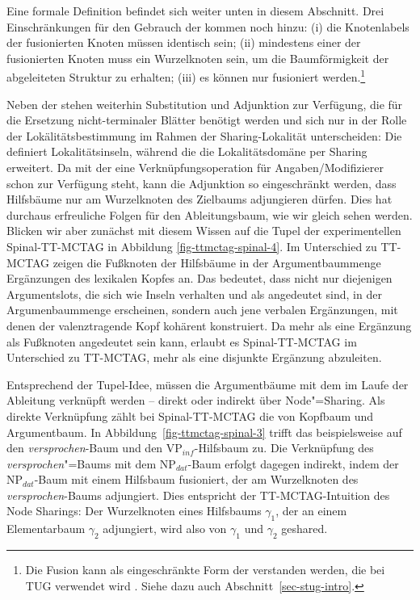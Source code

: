 Eine formale Definition befindet sich weiter unten in diesem Abschnitt. Drei Einschränkungen für den Gebrauch der  kommen noch hinzu: (i) die Knotenlabels der fusionierten Knoten müssen identisch sein; (ii) mindestens einer der fusionierten Knoten muss ein Wurzelknoten sein, um die Baumförmigkeit der abgeleiteten Struktur zu erhalten; (iii) es können nur  fusioniert werden.\footnote{Die Fusion kann als eingeschränkte Form der  verstanden werden, die bei TUG verwendet wird \citep{Popowich:89,Gerdes:04}. Siehe dazu auch Abschnitt~\ref{sec-stug-intro}.} 

Neben der  stehen weiterhin Substitution und Adjunktion zur Verfügung, die für die Ersetzung nicht-terminaler Blätter benötigt werden und sich nur in der Rolle der Lokälitätsbestimmung im Rahmen der Sharing-Lokalität unterscheiden: Die  definiert Lokalitätsinseln, während die  die Lokalitätsdomäne per Sharing erweitert. Da mit der  eine Verknüpfungsoperation für Angaben/Modifizierer schon zur Verfügung steht, kann die Adjunktion so eingeschränkt werden, dass Hilfsbäume nur am Wurzelknoten des Zielbaums adjungieren dürfen. Dies hat durchaus erfreuliche Folgen für den Ableitungsbaum, wie wir gleich sehen werden. Blicken wir aber zunächst mit diesem Wissen auf die Tupel der experimentellen Spinal-TT-MCTAG in Abbildung \ref{fig-ttmctag-spinal-4}. 
Im Unterschied zu TT-MCTAG zeigen die Fu\ss knoten der Hilfsbäume in der Argumentbaummenge Ergänzungen des lexikalen Kopfes an. Das bedeutet, dass nicht nur diejenigen Argumentslots, die sich wie Inseln verhalten und als  angedeutet sind, in der Argumenbaummenge erscheinen,  sondern auch jene verbalen Ergänzungen, mit denen der valenztragende Kopf kohärent konstruiert. Da mehr als eine Ergänzung als Fu\ss knoten angedeutet sein kann, erlaubt es Spinal-TT-MCTAG im Unterschied zu TT-MCTAG, mehr als eine disjunkte Ergänzung abzuleiten.  

Entsprechend der Tupel-Idee, müssen die Argumentbäume mit dem  im Laufe der Ableitung verknüpft werden -- direkt oder indirekt über Node"=Sharing. Als direkte Verknüpfung zählt bei Spinal-TT-MCTAG die  von Kopfbaum und Argumentbaum. In Abbildung~\ref{fig-ttmctag-spinal-3} trifft das beispielsweise auf den {\it versprochen}-Baum und den VP$_{inf}$-Hilfsbaum zu. Die Verknüpfung des {\it versprochen}"=Baums mit dem NP$_{dat}$-Baum erfolgt dagegen indirekt, indem der NP$_{dat}$-Baum mit einem Hilfsbaum fusioniert, der am Wurzelknoten des {\it versprochen}-Baums adjungiert. Dies entspricht der TT-MCTAG-Intuition des Node Sharings: Der Wurzelknoten eines Hilfsbaums $\gamma_1$, der an einem Elementarbaum $\gamma_2$ adjungiert, wird also von $\gamma_1$ und $\gamma_2$ geshared. \\

